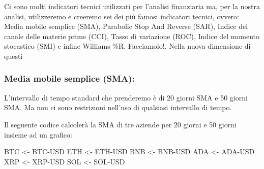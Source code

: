 \documentclass[]{tufte-handout}
\newenvironment{Shaded}{}{}
\newcommand{\AttributeTok}[1]{\textcolor[rgb]{0.49,0.56,0.16}{#1}}
\newcommand{\CommentTok}[1]{\textcolor[rgb]{0.38,0.63,0.69}{\textit{#1}}}
\newcommand{\DecValTok}[1]{\textcolor[rgb]{0.25,0.63,0.44}{#1}}
\newcommand{\FunctionTok}[1]{\textcolor[rgb]{0.02,0.16,0.49}{#1}}
\newcommand{\NormalTok}[1]{#1}
\newcommand{\OtherTok}[1]{\textcolor[rgb]{0.00,0.44,0.13}{#1}}
\newcommand{\SpecialCharTok}[1]{\textcolor[rgb]{0.25,0.44,0.63}{#1}}
\newcommand{\StringTok}[1]{\textcolor[rgb]{0.25,0.44,0.63}{#1}}
\begin{document}
Ci sono molti indicatori tecnici utilizzati per l'analisi finanziaria
ma, per la nostra analisi, utilizzeremo e creeremo sei dei più famosi
indicatori tecnici, ovvero: Media mobile semplice (SMA), Parabolic Stop
And Reverse (SAR), Indice del canale delle materie prime (CCI), Tasso di
variazione (ROC), Indice del momento stocastico (SMI) e infine Williams
\%R. Facciamolo!. Nella nuova dimensione di questi

\hypertarget{media-mobile-semplice-sma}{%
\subsubsection{Media mobile semplice
(SMA):}\label{media-mobile-semplice-sma}}

L'intervallo di tempo standard che prenderemo è di 20 giorni SMA e 50
giorni SMA. Ma non ci sono restrizioni nell'uso di qualsiasi intervallo
di tempo.

Il seguente codice calcolerà la SMA di tre aziende per 20 giorni e 50
giorni insieme ad un grafico:

\begin{Shaded}
\begin{Highlighting}[]
\NormalTok{BTC }\OtherTok{\textless{}{-}} \StringTok{\textasciigrave{}}\AttributeTok{BTC{-}USD}\StringTok{\textasciigrave{}}
\NormalTok{ETH }\OtherTok{\textless{}{-}} \StringTok{\textasciigrave{}}\AttributeTok{ETH{-}USD}\StringTok{\textasciigrave{}}
\NormalTok{BNB }\OtherTok{\textless{}{-}} \StringTok{\textasciigrave{}}\AttributeTok{BNB{-}USD}\StringTok{\textasciigrave{}}
\NormalTok{ADA }\OtherTok{\textless{}{-}} \StringTok{\textasciigrave{}}\AttributeTok{ADA{-}USD}\StringTok{\textasciigrave{}}
\NormalTok{XRP }\OtherTok{\textless{}{-}} \StringTok{\textasciigrave{}}\AttributeTok{XRP{-}USD}\StringTok{\textasciigrave{}}
\NormalTok{SOL }\OtherTok{\textless{}{-}} \StringTok{\textasciigrave{}}\AttributeTok{SOL{-}USD}\StringTok{\textasciigrave{}}
\end{Highlighting}
\end{Shaded}

\begin{Shaded}
\end{Shaded}
\end{document}

